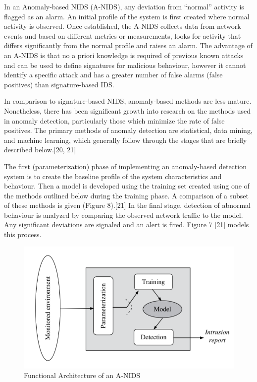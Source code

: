 \documentclass[11pt,a4paper]{article}
\begin{document}
In an Anomaly-based NIDS (A-NIDS), any deviation from ``normal''
activity is flagged as an alarm. An initial profile of the system is
first created where normal activity is observed. Once established, the
A-NIDS collects data from network events and based on different metrics
or measurements, looks for activity that differs significantly from the
normal profile and raises an alarm. The advantage of an A-NIDS is that
no a priori knowledge is required of previous known attacks and can be
used to define signatures for malicious behaviour, however it cannot
identify a specific attack and has a greater number of false alarms
(false positives) than signature-based IDS.

In comparison to signature-based NIDS, anomaly-based methods are less
mature. Nonetheless, there has been significant growth into research on
the methods used in anomaly detection, particularly those which minimize
the rate of false positives. The primary methods of anomaly detection
are statistical, data mining, and machine learning, which generally
follow through the stages that are briefly described below.{[}20, 21{]}

The first (parameterization) phase of implementing an anomaly-based
detection system is to create the baseline profile of the system
characteristics and behaviour. Then a model is developed using the
training set created using one of the methods outlined below during the
training phase. A comparison of a subset of these methods is given
(Figure 8).{[}21{]} In the final stage, detection of abnormal behaviour
is analyzed by comparing the observed network traffic to the model. Any
significant deviations are signaled and an alert is fired. Figure 7
{[}21{]} models this process.

\begin{figure}[h]

{\centering \includegraphics{thesis_files/figure-latex/unnamed-chunk-10-1} 

}

\caption{Functional Architecture of an A-NIDS}\label{fig:unnamed-chunk-10}
\end{figure}
\end{document}
